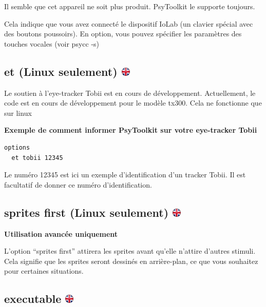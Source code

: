\documentclass[
]{book}
\begin{document}
Il semble que cet appareil ne soit plus produit. PsyToolkit le supporte toujours.

Cela indique que vous avez connecté le dispositif IoLab (un clavier spécial avec des boutons poussoirs). En option, vous pouvez spécifier les paramètres des touches vocales (voir psycc -s)

\hypertarget{et-linux-seulement}{%
\subsection[et (Linux seulement) ]{\texorpdfstring{et (Linux seulement) \href{https://www.psytoolkit.org/doc3.2.0/syntax.html\#options-et}{\protect\includegraphics{img/ukflag.png}}}{et (Linux seulement) }}\label{et-linux-seulement}}

Le soutien à l'eye-tracker Tobii est en cours de développement. Actuellement, le code est en cours de développement pour le modèle tx300. Cela ne fonctionne que sur linux

\textbf{Exemple de comment informer PsyToolkit sur votre eye-tracker Tobii}

\begin{verbatim}
options
  et tobii 12345
\end{verbatim}

Le numéro 12345 est ici un exemple d'identification d'un tracker Tobii. Il est facultatif de donner ce numéro d'identification.

\hypertarget{sprites-first-linux-seulement}{%
\subsection[sprites first (Linux seulement) ]{\texorpdfstring{sprites first (Linux seulement) \href{https://www.psytoolkit.org/doc3.2.0/syntax.html\#options-sprites-first}{\protect\includegraphics{img/ukflag.png}}}{sprites first (Linux seulement) }}\label{sprites-first-linux-seulement}}

\textbf{Utilisation avancée uniquement}

L'option ``sprites first'' attirera les sprites avant qu'elle n'attire d'autres stimuli. Cela signifie que les sprites seront dessinés en arrière-plan, ce que vous souhaitez pour certaines situations.

\hypertarget{executable}{%
\subsection[executable ]{\texorpdfstring{executable \href{https://www.psytoolkit.org/doc3.2.0/syntax.html\#options-executable}{\protect\includegraphics{img/ukflag.png}}}{executable }}\label{executable}}
\end{document}
